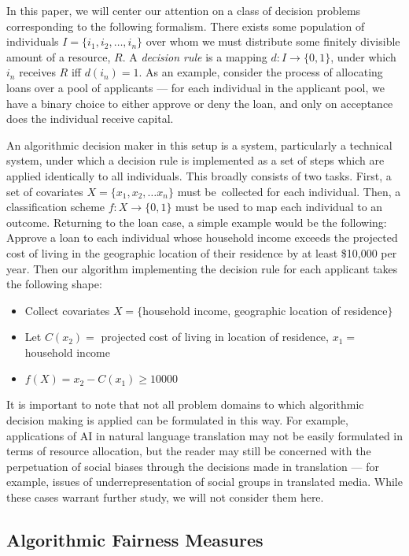 In this paper, we will center our attention on a class of decision problems
corresponding to the following formalism. There exists some population of 
individuals $I = \{i_1, i_2, \ldots, i_n\}$ over whom we must distribute some
finitely divisible amount of a resource, $R$. A \textit{decision rule} is a
mapping $d: I \rightarrow \{0, 1\}$, under which $i_n$ receives $R$ iff
$d(i_n) = 1$. As an example, consider the process of allocating loans over a
pool of applicants — for each individual in the applicant pool, we have a binary
choice to either approve or deny the loan, and only on acceptance does the
individual receive capital.

An algorithmic decision maker in this setup is a system, particularly a
technical system, under which a decision rule is implemented as a set of steps
which are applied identically to all individuals. This broadly consists of two
tasks. First, a set of covariates $X = \{x_1, x_2, \ldots x_n\}$ must be\
collected for each individual. Then, a classification scheme
$f: X \rightarrow \{0, 1\}$ must be used to map each individual to an outcome.
Returning to the loan case, a simple example would be the following: Approve a
loan to each individual whose household income exceeds the projected cost of
living in the geographic location of their residence by at least \$10,000 per
year. Then our algorithm implementing the decision rule for each applicant takes
the following shape:
\begin{itemize}
    \item Collect covariates $X=\{$household income, geographic location of residence$\}$
    \item Let $C(x_2) =$ projected cost of living in location of residence, $x_1 =$
          household income
    \item $f(X) = x_2 - C(x_1) \geq 10000$
\end{itemize}

It is important to note that not all problem domains to which algorithmic
decision making is applied can be formulated in this way. For example,
applications of AI in natural language translation may not be easily formulated
in terms of resource allocation, but the reader may still be concerned with the
perpetuation of social biases through the decisions made in translation — for
example, issues of underrepresentation of social groups in translated media.  
While these cases warrant further study, we will not consider them here.

\subsection{Algorithmic Fairness Measures}\label{sec:fairness-measures}

